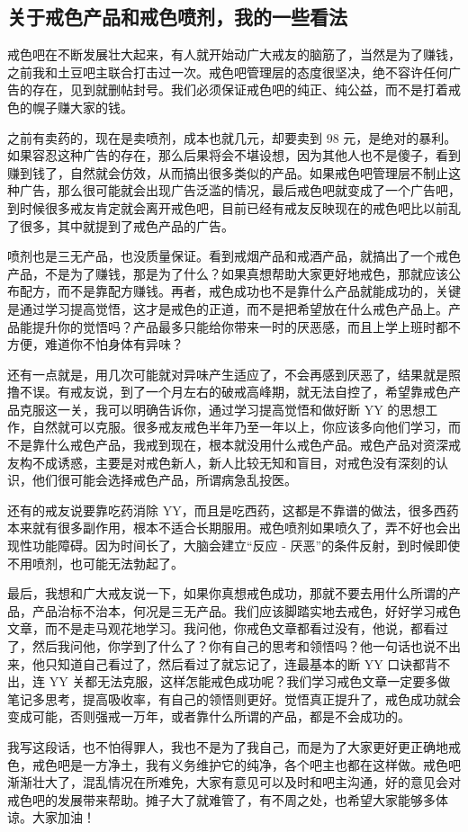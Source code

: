 \subsection{关于戒色产品和戒色喷剂，我的一些看法}

戒色吧在不断发展壮大起来，有人就开始动广大戒友的脑筋了，当然是为了赚钱，之前我和土豆吧主联合打击过一次。戒色吧管理层的态度很坚决，绝不容许任何广告的存在，见到就删帖封号。我们必须保证戒色吧的纯正、纯公益，而不是打着戒色的幌子赚大家的钱。

之前有卖药的，现在是卖喷剂，成本也就几元，却要卖到 98 元，是绝对的暴利。如果容忍这种广告的存在，那么后果将会不堪设想，因为其他人也不是傻子，看到赚到钱了，自然就会仿效，从而搞出很多类似的产品。如果戒色吧管理层不制止这种广告，那么很可能就会出现广告泛滥的情况，最后戒色吧就变成了一个广告吧，到时候很多戒友肯定就会离开戒色吧，目前已经有戒友反映现在的戒色吧比以前乱了很多，其中就提到了戒色产品的广告。

喷剂也是三无产品，也没质量保证。看到戒烟产品和戒酒产品，就搞出了一个戒色产品，不是为了赚钱，那是为了什么？如果真想帮助大家更好地戒色，那就应该公布配方，而不是靠配方赚钱。再者，戒色成功也不是靠什么产品就能成功的，关键是通过学习提高觉悟，这才是戒色的正道，而不是把希望放在什么戒色产品上。产品能提升你的觉悟吗？产品最多只能给你带来一时的厌恶感，而且上学上班时都不方便，难道你不怕身体有异味？

还有一点就是，用几次可能就对异味产生适应了，不会再感到厌恶了，结果就是照撸不误。有戒友说，到了一个月左右的破戒高峰期，就无法自控了，希望靠戒色产品克服这一关，我可以明确告诉你，通过学习提高觉悟和做好断 YY 的思想工作，自然就可以克服。很多戒友戒色半年乃至一年以上，你应该多向他们学习，而不是靠什么戒色产品，我戒到现在，根本就没用什么戒色产品。戒色产品对资深戒友构不成诱惑，主要是对戒色新人，新人比较无知和盲目，对戒色没有深刻的认识，他们很可能会选择戒色产品，所谓病急乱投医。

还有的戒友说要靠吃药消除 YY，而且是吃西药，这都是不靠谱的做法，很多西药本来就有很多副作用，根本不适合长期服用。戒色喷剂如果喷久了，弄不好也会出现性功能障碍。因为时间长了，大脑会建立“反应 - 厌恶”的条件反射，到时候即使不用喷剂，也可能无法勃起了。

最后，我想和广大戒友说一下，如果你真想戒色成功，那就不要去用什么所谓的产品，产品治标不治本，何况是三无产品。我们应该脚踏实地去戒色，好好学习戒色文章，而不是走马观花地学习。我问他，你戒色文章都看过没有，他说，都看过了，然后我问他，你学到了什么了？你有自己的思考和领悟吗？他一句话也说不出来，他只知道自己看过了，然后看过了就忘记了，连最基本的断 YY 口诀都背不出，连 YY 关都无法克服，这样怎能戒色成功呢？我们学习戒色文章一定要多做笔记多思考，提高吸收率，有自己的领悟则更好。觉悟真正提升了，戒色成功就会变成可能，否则强戒一万年，或者靠什么所谓的产品，都是不会成功的。

我写这段话，也不怕得罪人，我也不是为了我自己，而是为了大家更好更正确地戒色，戒色吧是一方净土，我有义务维护它的纯净，各个吧主也都在这样做。戒色吧渐渐壮大了，混乱情况在所难免，大家有意见可以及时和吧主沟通，好的意见会对戒色吧的发展带来帮助。摊子大了就难管了，有不周之处，也希望大家能够多体谅。大家加油！
